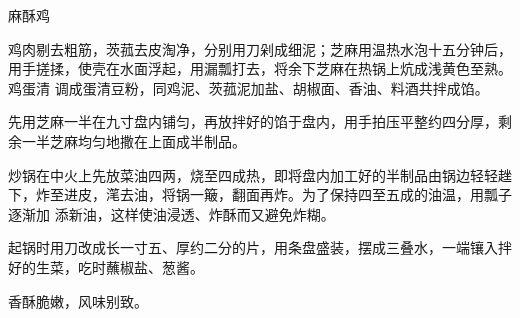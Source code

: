 %
%
%
%
%
%
%
\begin{recipe}{麻酥鸡}

\ingredients


\preparation

\step 鸡肉剔去粗筋，茨菰去皮淘净，分别用刀剁成细泥；芝麻用温热水泡十五分钟后，
用手搓揉，使壳在水面浮起，用漏瓢打去，将余下芝麻在热锅上炕成浅黄色至熟。鸡蛋清
调成蛋清豆粉，同鸡泥、茨菰泥加盐、胡椒面、香油、料酒共拌成馅。

\step 先用芝麻一半在九寸盘内铺匀，再放拌好的馅于盘内，用手拍压平整约四分厚，剩
余一半芝麻均匀地撒在上面成半制品。

\step 炒锅在中火上先放菜油四两，烧至四成热，即将盘内加工好的半制品由锅边轻轻趖
下，炸至进皮，滗去油，将锅一簸，翻面再炸。为了保持四至五成的油温，用瓢子逐渐加
添新油，这样使油浸透、炸酥而又避免炸糊。

\step 起锅时用刀改成长一寸五、厚约二分的片，用条盘盛装，摆成三叠水，一端镶入拌
好的生菜，吃时蘸椒盐、葱酱。

\features

香酥脆嫩，风味别致。

\end{recipe}

